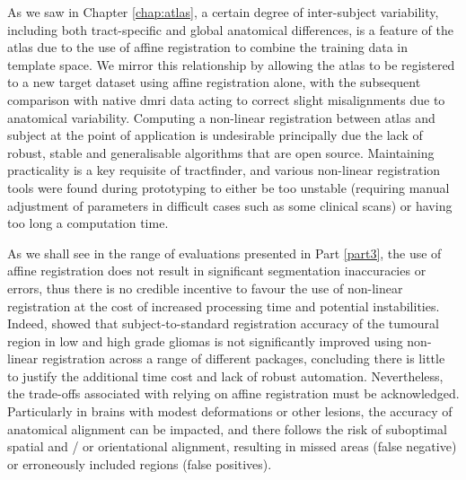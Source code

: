 As we saw in Chapter \ref{chap:atlas}, a certain degree of inter-subject variability, including both tract-specific and global anatomical differences, is a feature of the atlas due to the use of affine registration to combine the training data in template space.
We mirror this relationship by allowing the atlas to be registered to a new target dataset using affine registration alone, with the subsequent comparison with native \gls{dmri} data acting to correct slight misalignments due to anatomical variability.
Computing a non-linear registration between atlas and subject at the point of application is undesirable principally due the lack of robust, stable and generalisable algorithms that are open source.
Maintaining practicality is a key requisite of tractfinder, and various non-linear registration tools were found during prototyping to either be too unstable (requiring manual adjustment of parameters in difficult cases such as some clinical scans) or having too long a computation time.\autocite{Visser2020}

As we shall see in the range of evaluations presented in Part \ref{part3}, the use of affine registration does not result in significant segmentation inaccuracies or errors, thus there is no credible incentive to favour the use of non-linear registration at the cost of increased processing time and potential instabilities.
Indeed, \textcite{Visser2020} showed that subject-to-standard registration accuracy of the tumoural region in low and high grade gliomas is not significantly improved using non-linear registration across a range of different packages, concluding there is little to justify the additional time cost and lack of robust automation.
Nevertheless, the trade-offs associated with relying on affine registration must be acknowledged.
Particularly in brains with modest deformations or other lesions, the accuracy of anatomical alignment can be impacted, and there follows the risk of suboptimal spatial and / or orientational alignment, resulting in missed areas (false negative) or erroneously included regions (false positives).

